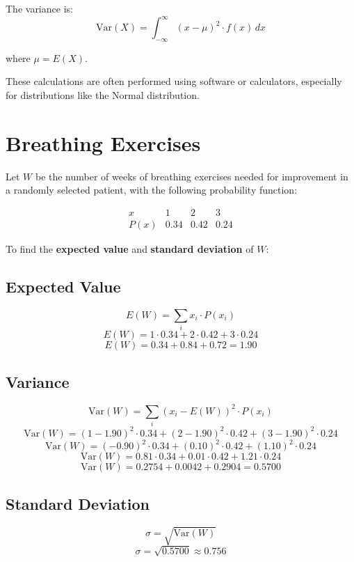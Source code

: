 \documentclass{article}
\begin{document}
The variance is:
\[
\text{Var}(X) = \int_{-\infty}^{\infty} (x - \mu)^2 \cdot f(x) \, dx
\]

where \(\mu = E(X)\). 

These calculations are often performed using software or calculators, especially for distributions like the Normal distribution.

\section*{Breathing Exercises}

Let \(W\) be the number of weeks of breathing exercises needed for improvement in a randomly selected patient, with the following probability function:

\[
\begin{array}{ccc}
x & 1 & 2 & 3 \\
P(x) & 0.34 & 0.42 & 0.24
\end{array}
\]

To find the \textbf{expected value} and \textbf{standard deviation} of \(W\):

\subsection*{Expected Value}

\[
E(W) = \sum_{i} x_i \cdot P(x_i)
\]
\[
E(W) = 1 \cdot 0.34 + 2 \cdot 0.42 + 3 \cdot 0.24
\]
\[
E(W) = 0.34 + 0.84 + 0.72 = 1.90
\]

\subsection*{Variance}

\[
\text{Var}(W) = \sum_{i} (x_i - E(W))^2 \cdot P(x_i)
\]
\[
\text{Var}(W) = (1 - 1.90)^2 \cdot 0.34 + (2 - 1.90)^2 \cdot 0.42 + (3 - 1.90)^2 \cdot 0.24
\]
\[
\text{Var}(W) = (-0.90)^2 \cdot 0.34 + (0.10)^2 \cdot 0.42 + (1.10)^2 \cdot 0.24
\]
\[
\text{Var}(W) = 0.81 \cdot 0.34 + 0.01 \cdot 0.42 + 1.21 \cdot 0.24
\]
\[
\text{Var}(W) = 0.2754 + 0.0042 + 0.2904 = 0.5700
\]

\subsection*{Standard Deviation}

\[
\sigma = \sqrt{\text{Var}(W)}
\]
\[
\sigma = \sqrt{0.5700} \approx 0.756
\]
\end{document}
